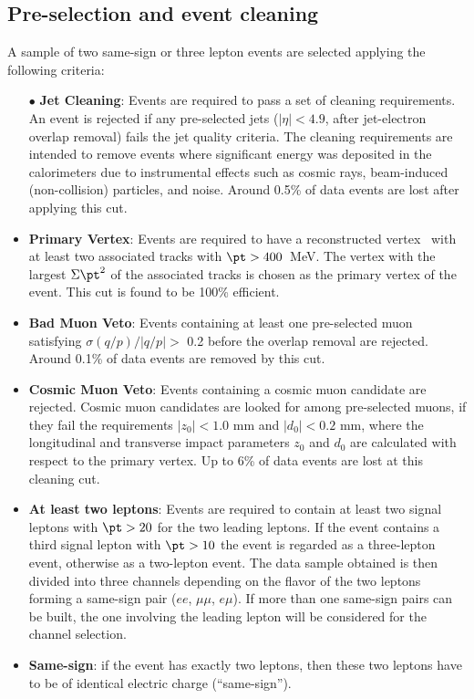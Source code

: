 \subsection{Pre-selection and event cleaning}
\label{subsec:sec.strategy.selection_cleaning}

A sample of two same-sign or three lepton events are selected applying the following criteria:
\begin{itemize}
\item[$\bullet$] \textbf{Jet Cleaning}: 
Events are required to pass a set of cleaning requirements. 
An event is rejected if any pre-selected jets ($|\eta|<4.9$, after 
jet-electron overlap removal) fails the jet quality criteria. 
The cleaning requirements are intended to remove events where significant 
energy was deposited in the calorimeters 
due to instrumental effects such as cosmic rays, beam-induced (non-collision) 
particles, and noise. Around 0.5\% of data events are lost after applying 
this cut.

\item \textbf{Primary Vertex}:
Events are required to have a reconstructed vertex~\cite{ATL-PHYS-PUB-2015-026} 
with at least two associated tracks with $\pt >400$~MeV. The vertex with the largest $\Sigma \pt^2$ of the associated tracks 
is chosen as the primary vertex of the event.
This cut is found to be 100\% efficient.

\item \textbf{Bad Muon Veto}: 
Events containing at least one pre-selected muon satisfying $\sigma(q/p)/|q/p| >$ 0.2 before the overlap removal are rejected. 
Around 0.1\% of data events are removed by this cut.

\item \textbf{Cosmic Muon Veto}: 
Events containing a cosmic muon candidate are rejected. 
Cosmic muon candidates are looked for among pre-selected muons, 
if they fail the requirements $|z_0| <1.0$ mm and $|d_0|<0.2$ mm, 
where the longitudinal and transverse impact parameters $z_0$ and $d_0$ 
are calculated with respect to the primary vertex. 
Up to 6\% of data events are lost at this cleaning cut.

\item \textbf{At least two leptons}: 
Events are required to contain at least two signal leptons 
with $\pt>20$ \GeV for the two leading leptons. 
If the event contains a third signal lepton with $\pt>10$ \GeV the event is regarded as a three-lepton event, otherwise as a two-lepton event. 
The data sample obtained is then divided into three channels depending on the flavor of the two  leptons forming a same-sign pair ($ee$, $\mu\mu$, $e\mu$). 
If more than one same-sign pairs can be built, the one involving the leading 
lepton will be considered for the channel selection. 

\item \textbf{Same-sign}: 
if the event has exactly two leptons, then these two leptons
 have to be of identical electric charge (``same-sign'').
\end{itemize}

